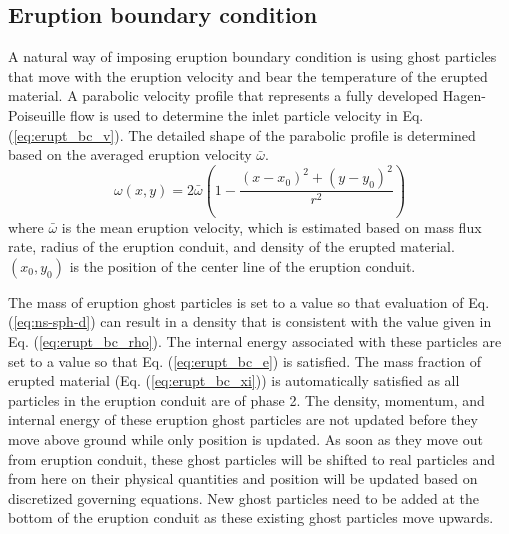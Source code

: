 \subsection{Eruption boundary condition}
A natural way of imposing eruption boundary condition is using ghost particles that move with the eruption velocity and bear the temperature of the erupted material. A parabolic velocity profile that represents a fully developed Hagen-Poiseuille flow is used to determine the inlet particle velocity in Eq. (\ref{eq:erupt_bc_v}). The detailed shape of the parabolic profile is determined based on the averaged eruption velocity $\bar{\omega}$.
\begin{equation}
\omega (x, y) = 2 \bar{\omega} \left(1-\frac{(x-x_0)^2 + (y-y_0)^2}{r^2}\right)
\label{eq:erupt_bc_v-discrete}
\end{equation}
where $\bar{\omega}$ is the mean eruption velocity, which is estimated based on mass flux rate, radius of the eruption conduit, and density of the erupted material. $(x_0, y_0)$ is the position of the center line of the eruption conduit.

The mass of eruption ghost particles is set to a value so that evaluation of Eq. (\ref{eq:ns-sph-d}) can result in a density that is consistent with the value given in Eq. (\ref{eq:erupt_bc_rho}). 
The internal energy associated with these particles are set to a value so that Eq. (\ref{eq:erupt_bc_e}) is satisfied. The mass fraction of erupted material (Eq. (\ref{eq:erupt_bc_xi})) is automatically satisfied as all particles in the eruption conduit are of phase 2. The density, momentum, and internal energy of these eruption ghost particles are not updated before they move above ground while only position is updated. As soon as they move out from eruption conduit, these ghost particles will be shifted to real particles and from here on their physical quantities and position will be updated based on discretized governing equations. New ghost particles need to be added at the bottom of the eruption conduit as these existing ghost particles move upwards.

